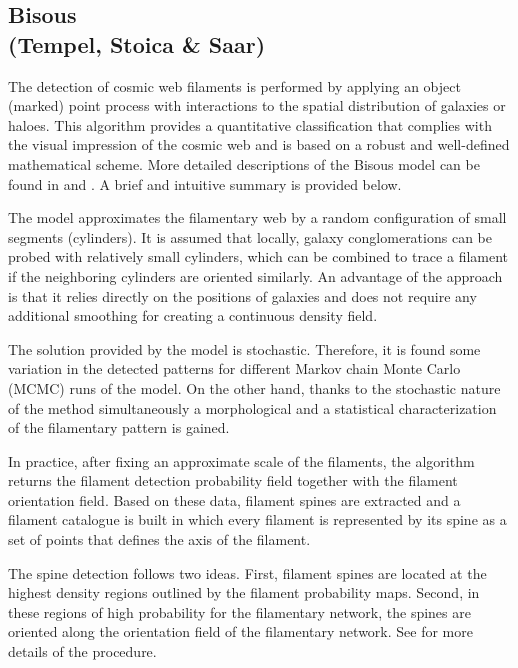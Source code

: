\subsection{Bisous\\ \hskip 0.75cm (Tempel, Stoica \& Saar)}

The detection of cosmic web filaments is performed by applying an object (marked) point process with interactions \citep[the Bisous process;][]{stoica2005} to the spatial distribution of galaxies or haloes. This algorithm provides a quantitative classification that complies with the visual impression of the cosmic web and is based on a robust and well-defined mathematical scheme. More detailed descriptions of the Bisous model can be found in \citet{2007JRSSC..56....1S,2010A&A...510A..38S} and \citet{tempel2014, 2016AC....16...17T}. A brief and intuitive summary is provided below.

The model approximates the filamentary web by a random configuration of small segments (cylinders). It is assumed that locally, galaxy conglomerations can be probed with relatively small cylinders, which can be combined to trace a filament if the neighboring cylinders are oriented similarly. An advantage of the approach is that it relies directly on the positions of galaxies and does not require any additional smoothing for creating a continuous density field.

The solution provided by the model is stochastic. Therefore, it is found some variation in the detected patterns for different Markov chain Monte Carlo (MCMC) runs of the model. On the other hand, thanks to the stochastic nature of the method simultaneously a morphological and a statistical characterization of the 
filamentary pattern is gained.

In practice, after fixing an approximate scale of the filaments, the algorithm returns the filament detection probability field together with the filament orientation field. Based on these data, filament spines are extracted and a filament catalogue is built in which every filament is represented by its spine as a set of points that defines the axis of the filament.

The spine detection follows two ideas. First, filament spines are located at the highest density regions outlined by the filament probability maps. Second, in these regions of high probability for the filamentary network, the spines are oriented along the orientation field of the filamentary network. See \citet{tempel2014, 2016AC....16...17T} for more details of the procedure.


